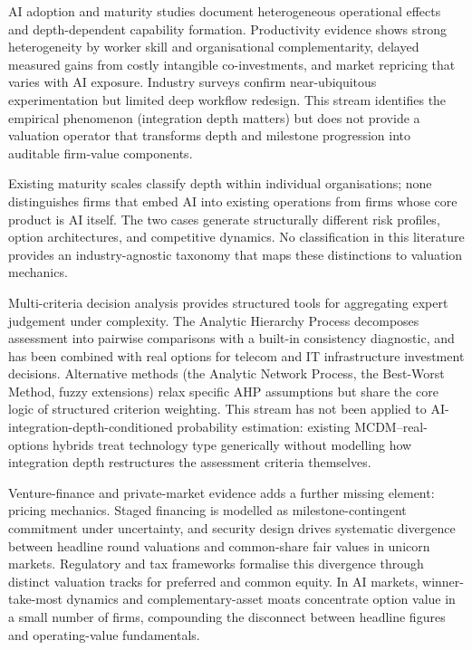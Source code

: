 \documentclass[oneside,10pt]{swissi}
\begin{document}
AI adoption and maturity studies document heterogeneous operational effects and depth-dependent capability formation.\cite{hansen2024aicmm,dreyling2024aimm} Productivity evidence shows strong heterogeneity by worker skill and organisational complementarity,\cite{brynjolfsson2023generativework} delayed measured gains from costly intangible co-investments,\cite{brynjolfsson2018jcurve} and market repricing that varies with AI exposure.\cite{eisfeldt2023firmvalues} Industry surveys confirm near-ubiquitous experimentation but limited deep workflow redesign.\cite{mckinsey2025rewiring,mckinsey2025stateai} This stream identifies the empirical phenomenon (integration depth matters) but does not provide a valuation operator that transforms depth and milestone progression into auditable firm-value components.

Existing maturity scales classify depth within individual organisations; none distinguishes firms that embed AI into existing operations from firms whose core product is AI itself. The two cases generate structurally different risk profiles, option architectures, and competitive dynamics. No classification in this literature provides an industry-agnostic taxonomy that maps these distinctions to valuation mechanics.

Multi-criteria decision analysis provides structured tools for aggregating expert judgement under complexity. The Analytic Hierarchy Process decomposes assessment into pairwise comparisons with a built-in consistency diagnostic,\cite{saaty1980ahp} and has been combined with real options for telecom and IT infrastructure investment decisions.\cite{angelou2008ahpro} Alternative methods (the Analytic Network Process, the Best-Worst Method,\cite{rezaei2015bwm} fuzzy extensions) relax specific AHP assumptions but share the core logic of structured criterion weighting. This stream has not been applied to AI-integration-depth-conditioned probability estimation: existing MCDM--real-options hybrids treat technology type generically without modelling how integration depth restructures the assessment criteria themselves.

Venture-finance and private-market evidence adds a further missing element: pricing mechanics. Staged financing is modelled as milestone-contingent commitment under uncertainty,\cite{lerner2020vc,talmor2005staging} and security design drives systematic divergence between headline round valuations and common-share fair values in unicorn markets.\cite{gornall2020squaring} Regulatory and tax frameworks formalise this divergence through distinct valuation tracks for preferred and common equity.\cite{us26cfr1409a1,maplebear2023s1correspondence} In AI markets, winner-take-most dynamics and complementary-asset moats concentrate option value in a small number of firms,\cite{korinek2025concentrating,azoulay2024oldmoats,rochet2003platform} compounding the disconnect between headline figures and operating-value fundamentals.
\end{document}
